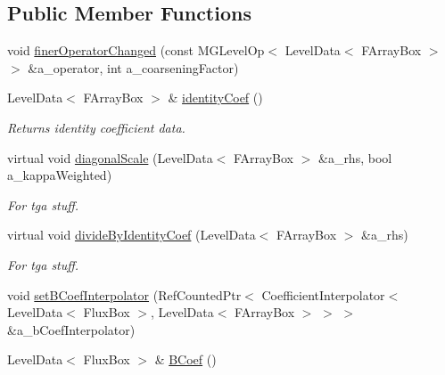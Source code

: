 \subsection*{Public Member Functions}
\begin{DoxyCompactItemize}
\item 
void \hyperlink{class_darcy_brinkman_op_ac6da9fd6f61b40c42b3a94b645c21e35}{finer\-Operator\-Changed} (const M\-G\-Level\-Op$<$ Level\-Data$<$ F\-Array\-Box $>$ $>$ \&a\-\_\-operator, int a\-\_\-coarsening\-Factor)
\item 
\hypertarget{class_darcy_brinkman_op_a27d3f026aea19d8b7f14f6801d4fb479}{Level\-Data$<$ F\-Array\-Box $>$ \& \hyperlink{class_darcy_brinkman_op_a27d3f026aea19d8b7f14f6801d4fb479}{identity\-Coef} ()}\label{class_darcy_brinkman_op_a27d3f026aea19d8b7f14f6801d4fb479}

\begin{DoxyCompactList}\small\item\em Returns identity coefficient data. \end{DoxyCompactList}\item 
\hypertarget{class_darcy_brinkman_op_a4c661019f1436c2d7f68e6d7ec8a216c}{virtual void \hyperlink{class_darcy_brinkman_op_a4c661019f1436c2d7f68e6d7ec8a216c}{diagonal\-Scale} (Level\-Data$<$ F\-Array\-Box $>$ \&a\-\_\-rhs, bool a\-\_\-kappa\-Weighted)}\label{class_darcy_brinkman_op_a4c661019f1436c2d7f68e6d7ec8a216c}

\begin{DoxyCompactList}\small\item\em For tga stuff. \end{DoxyCompactList}\item 
\hypertarget{class_darcy_brinkman_op_a6b3aa7b8af250978e180b477a9037061}{virtual void \hyperlink{class_darcy_brinkman_op_a6b3aa7b8af250978e180b477a9037061}{divide\-By\-Identity\-Coef} (Level\-Data$<$ F\-Array\-Box $>$ \&a\-\_\-rhs)}\label{class_darcy_brinkman_op_a6b3aa7b8af250978e180b477a9037061}

\begin{DoxyCompactList}\small\item\em For tga stuff. \end{DoxyCompactList}\item 
void \hyperlink{class_darcy_brinkman_op_a291dd090a4475bcb95fe2901722660c9}{set\-B\-Coef\-Interpolator} (Ref\-Counted\-Ptr$<$ Coefficient\-Interpolator$<$ Level\-Data$<$ Flux\-Box $>$, Level\-Data$<$ F\-Array\-Box $>$ $>$ $>$ \&a\-\_\-b\-Coef\-Interpolator)
\item 
\hypertarget{class_darcy_brinkman_op_a9b2d72f39820a3dfcd502ea60232ddeb}{Level\-Data$<$ Flux\-Box $>$ \& \hyperlink{class_darcy_brinkman_op_a9b2d72f39820a3dfcd502ea60232ddeb}{B\-Coef} ()}\label{class_darcy_brinkman_op_a9b2d72f39820a3dfcd502ea60232ddeb}


\end{DoxyCompactItemize}
